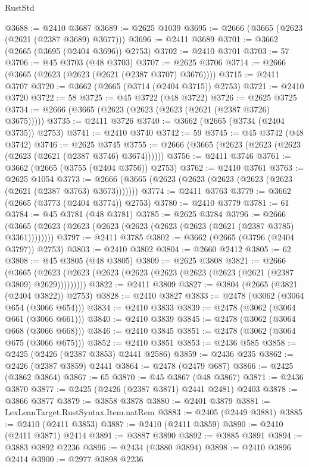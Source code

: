 \begin{lexlean}{RustStd}
\begin{coremodule}
@3688 := @2410 @3687
@3689 := @2625 @1039
@3695 := @2666 (@3665 (@2623 (@2621 (@2387 @3689) @3677)))
@3696 := @2411 @3689
@3701 := @3662 (@2665 (@3695 (@2404 @3696)) @2753)
@3702 := @2410 @3701
@3703 := 57
@3706 := @45 @3703 (@48 @3703)
@3707 := @2625 @3706
@3714 := @2666 (@3665 (@2623 (@2623 (@2621 (@2387 @3707) @3676))))
@3715 := @2411 @3707
@3720 := @3662 (@2665 (@3714 (@2404 @3715)) @2753)
@3721 := @2410 @3720
@3722 := 58
@3725 := @45 @3722 (@48 @3722)
@3726 := @2625 @3725
@3734 := @2666 (@3665 (@2623 (@2623 (@2623 (@2621 (@2387 @3726) @3675)))))
@3735 := @2411 @3726
@3740 := @3662 (@2665 (@3734 (@2404 @3735)) @2753)
@3741 := @2410 @3740
@3742 := 59
@3745 := @45 @3742 (@48 @3742)
@3746 := @2625 @3745
@3755 := @2666 (@3665 (@2623 (@2623 (@2623 (@2623 (@2621 (@2387 @3746) @3674))))))
@3756 := @2411 @3746
@3761 := @3662 (@2665 (@3755 (@2404 @3756)) @2753)
@3762 := @2410 @3761
@3763 := @2625 @1054
@3773 := @2666 (@3665 (@2623 (@2623 (@2623 (@2623 (@2623 (@2621 (@2387 @3763) @3673)))))))
@3774 := @2411 @3763
@3779 := @3662 (@2665 (@3773 (@2404 @3774)) @2753)
@3780 := @2410 @3779
@3781 := 61
@3784 := @45 @3781 (@48 @3781)
@3785 := @2625 @3784
@3796 := @2666 (@3665 (@2623 (@2623 (@2623 (@2623 (@2623 (@2623 (@2621 (@2387 @3785) @3361))))))))
@3797 := @2411 @3785
@3802 := @3662 (@2665 (@3796 (@2404 @3797)) @2753)
@3803 := @2410 @3802
@3804 := @2660 @2412
@3805 := 62
@3808 := @45 @3805 (@48 @3805)
@3809 := @2625 @3808
@3821 := @2666
    (@3665 (@2623 (@2623 (@2623 (@2623 (@2623 (@2623 (@2623 (@2621 (@2387 @3809) @2629)))))))))
@3822 := @2411 @3809
@3827 := @3804 (@2665 (@3821 (@2404 @3822)) @2753)
@3828 := @2410 @3827
@3833 := @2478 (@3062 (@3064 @654 (@3066 @654)))
@3834 := @2410 @3833
@3839 := @2478 (@3062 (@3064 @661 (@3066 @661)))
@3840 := @2410 @3839
@3845 := @2478 (@3062 (@3064 @668 (@3066 @668)))
@3846 := @2410 @3845
@3851 := @2478 (@3062 (@3064 @675 (@3066 @675)))
@3852 := @2410 @3851
@3853 := @2436 @585
@3858 := @2425 (@2426 (@2387 @3853) @2441 @2586)
@3859 := @2436 @235
@3862 := @2426 (@2387 @3859) @2441
@3864 := @2478 (@2479 @687)
@3866 := @2425 (@3862 @3864)
@3867 := 65
@3870 := @45 @3867 (@48 @3867)
@3871 := @2436 @3870
@3877 := @2425 (@2426 (@2387 @3871) @2441 @2481) @2403
@3878 := @3866 @3877
@3879 := @3858 @3878
@3880 := @2401 @3879
@3881 := LexLeanTarget.RustSyntax.Item.natRem
@3883 := @2405 (@2449 @3881)
@3885 := @2410 (@2411 @3853)
@3887 := @2410 (@2411 @3859)
@3890 := @2410 (@2411 @3871) @2414
@3891 := @3887 @3890
@3892 := @3885 @3891
@3894 := @3883 @3892 @2236
@3896 := @2434 (@3880 @3894)
@3898 := @2410 @3896 @2414
@3900 := @2977 @3898 @2236

\end{coremodule}
\end{lexlean}
